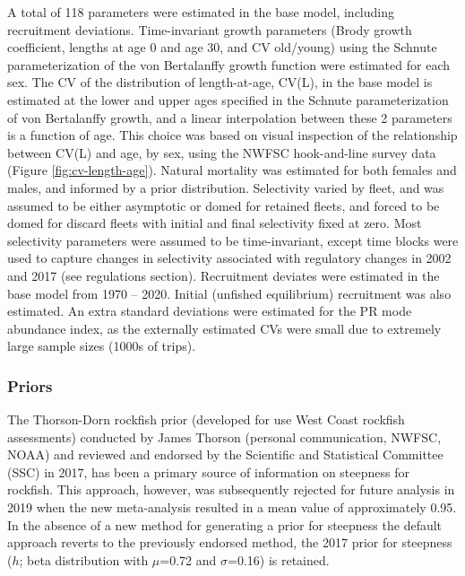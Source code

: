 \documentclass[11pt,
  english,
]{article}
\begin{document}
A total of 118 parameters were estimated in the base model, including recruitment deviations. Time-invariant growth parameters (Brody growth coefficient, lengths at age 0 and age 30, and CV old/young) using the Schnute parameterization of the von Bertalanffy growth function were estimated for each sex. The CV of the distribution of length-at-age, CV(L), in the base model is estimated at the lower and upper ages specified in the Schnute parameterization of von Bertalanffy growth, and a linear interpolation between these 2 parameters is a function of age. This choice was based on visual inspection of the relationship between CV(L) and age, by sex, using the NWFSC hook-and-line survey data (Figure \ref{fig:cv-length-age}). Natural mortality was estimated for both females and males, and informed by a prior distribution. Selectivity varied by fleet, and was assumed to be either asymptotic or domed for retained fleets, and forced to be domed for discard fleets with initial and final selectivity fixed at zero. Most selectivity parameters were assumed to be time-invariant, except time blocks were used to capture changes in selectivity associated with regulatory changes in 2002 and 2017 (see regulations section). Recruitment deviates were estimated in the base model from 1970 -- 2020. Initial (unfished equilibrium) recruitment was also estimated. An extra standard deviations were estimated for the PR mode abundance index, as the externally estimated CVs were small due to extremely large sample sizes (1000s of trips).


\hypertarget{priors}{%
\subsubsection{Priors}\label{priors}}

\leavevmode\tagmcend\tagstructend

The Thorson-Dorn rockfish prior (developed for use West Coast rockfish assessments) conducted by James Thorson (personal communication, NWFSC, NOAA) and reviewed and endorsed by the Scientific and Statistical Committee (SSC) in 2017, has been a primary source of information on steepness for rockfish. This approach, however, was subsequently rejected for future analysis in 2019 when the new meta-analysis resulted in a mean value of approximately 0.95. In the absence of a new method for generating a prior for steepness the default approach reverts to the previously endorsed method, the 2017 prior for steepness ({\(h\)\leavevmode\tagmcend\tagstructend}; beta distribution with {\(\mu\)\leavevmode\tagmcend\tagstructend}=0.72 and {\(\sigma\)\leavevmode\tagmcend\tagstructend}=0.16) is retained.
\end{document}
